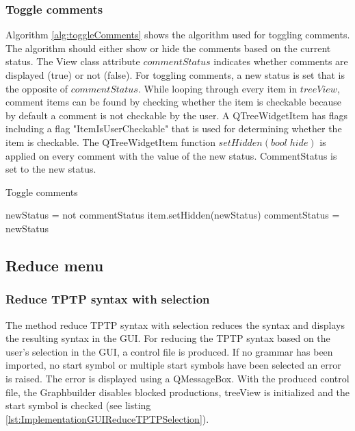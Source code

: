 \subsubsection{Toggle comments}\label{sec:ImplementationGUIToggleComments}

Algorithm \ref{alg:toggleComments} shows the algorithm used for toggling comments. The algorithm should either show or hide the comments based on the current status. 
The View class attribute $commentStatus$ indicates whether comments are displayed (true) or not (false). For toggling comments, a new status is set that is the opposite of $commentStatus$. While looping through every item in $treeView$, comment items can be found by checking whether the item is checkable because by default a comment is not checkable by the user. A QTreeWidgetItem has flags including a flag "ItemIsUserCheckable" that is used for determining whether the item is checkable. The QTreeWidgetItem function $setHidden(bool\;hide)$ is applied on every comment with the value of the new status. CommentStatus is set to the new status. 

\begin{algorithm}[H]
\caption{Toggle comments}
\label{alg:toggleComments}
\begin{algorithmic}[1] 
\State newStatus = not commentStatus
		\State item.setHidden(newStatus)
	\EndIf
\EndFor
\State commentStatus = newStatus
\end{algorithmic}
\end{algorithm}

\subsection{Reduce menu}\label{sec:ImplementationGUIReduceMenu}
\subsubsection{Reduce \ac{TPTP} syntax with selection}\label{sec:ImplementationGUIReduceWithSelection}

The method reduce \ac{TPTP} syntax with selection reduces the syntax and displays the resulting syntax in the GUI. 
For reducing the \ac{TPTP} syntax based on the user's selection in the GUI, a control file is produced. If no grammar has been imported, no start symbol or multiple start symbols have been selected an error is raised. The error is displayed using a QMessageBox. With the produced control file, the Graphbuilder disables blocked productions, treeView is initialized and the start symbol is checked (see listing \ref{lst:ImplementationGUIReduceTPTPSelection}). 

